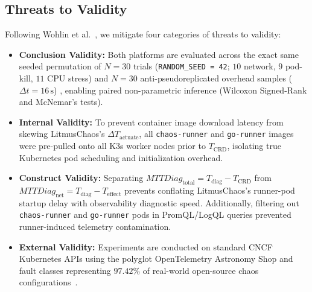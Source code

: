 \subsection{Threats to Validity}
Following Wohlin et al.~\cite{wohlin_2012}, we mitigate four categories of threats to validity:
\begin{itemize}
    \item \textbf{Conclusion Validity:} Both platforms are evaluated across the exact same seeded permutation of $N=30$ trials (\texttt{RANDOM\_SEED = 42}; $10$ network, $9$ pod-kill, $11$ CPU stress) and $N=30$ anti-pseudoreplicated overhead samples ($\Delta t = 16\,\text{s}$) \cite{hurlbert_1984}, enabling paired non-parametric inference (Wilcoxon Signed-Rank and McNemar's tests).
    \item \textbf{Internal Validity:} To prevent container image download latency from skewing LitmusChaos's $\Delta T_{\text{actuate}}$, all \texttt{chaos-runner} and \texttt{go-runner} images were pre-pulled onto all K3s worker nodes prior to $T_{\text{CRD}}$, isolating true Kubernetes pod scheduling and initialization overhead.
    \item \textbf{Construct Validity:} Separating $MTTDiag_{\text{total}} = T_{\text{diag}} - T_{\text{CRD}}$ from $MTTDiag_{\text{net}} = T_{\text{diag}} - T_{\text{effect}}$ prevents conflating LitmusChaos's runner-pod startup delay with observability diagnostic speed. Additionally, filtering out \texttt{chaos-runner} and \texttt{go-runner} pods in PromQL/LogQL queries prevented runner-induced telemetry contamination.
    \item \textbf{External Validity:} Experiments are conducted on standard CNCF Kubernetes APIs using the polyglot OpenTelemetry Astronomy Shop and fault classes representing $97.42\%$ of real-world open-source chaos configurations~\cite{owotogbe2026chaos}.
\end{itemize}